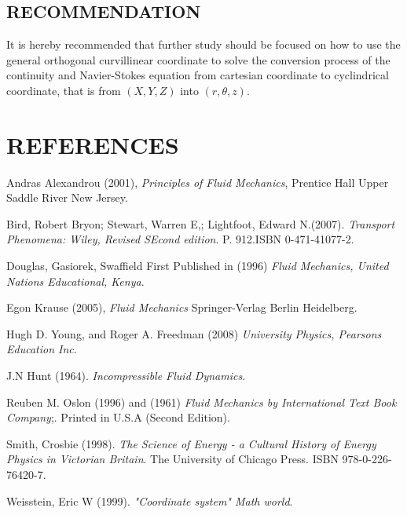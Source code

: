 \documentclass[a4paper, 12pt]{report}
\begin{document}
\section{RECOMMENDATION}
 It is hereby recommended that further study should be focused on how to use the general orthogonal curvillinear coordinate to solve the conversion process of the continuity and Navier-Stokes equation from cartesian coordinate to cyclindrical coordinate, that is from $(X, Y, Z)$ into $(r,\theta,z)$.


\newpage
\chapter*{REFERENCES}
	\begin{description}
		\item Andras Alexandrou (2001), \textit{Principles of Fluid Mechanics}, Prentice Hall Upper Saddle River New Jersey.
		
		\item Bird, Robert Bryon; Stewart, Warren E,; Lightfoot, Edward N.(2007). \textit{Transport Phenomena: Wiley, Revised SEcond edition}. P. 912.ISBN 0-471-41077-2.
		
		\item Douglas, Gasiorek, Swaffield First Published in (1996) \textit{Fluid Mechanics, United Nations Educational, Kenya}.
		
		\item Egon Krause (2005), \textit{Fluid Mechanics} Springer-Verlag Berlin Heidelberg.
		
		\item Hugh D. Young, and Roger A. Freedman (2008) \textit{University Physics, Pearsons Education Inc}.
		
		\item J.N Hunt (1964). \textit{Incompressible Fluid Dynamics}.
		
		\item Reuben M. Oslon (1996) and (1961) \textit{Fluid Mechanics by International Text Book Company};. Printed in U.S.A (Second Edition).
		
	
		\item Smith, Crosbie (1998). \textit{The Science of Energy - a Cultural History of Energy Physics in Victorian Britain}. The University of Chicago Press. ISBN 978-0-226-76420-7.
		
		\item Weisstein, Eric W (1999). \textit{"Coordinate system" Math world}.
		
	\end{description}
\end{document}
